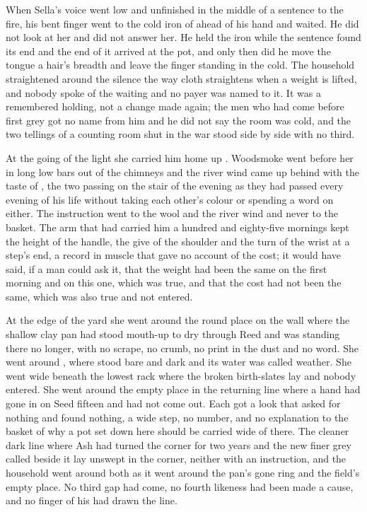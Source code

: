 When Sella's voice went low and unfinished in the middle of a sentence to the fire, his bent finger went to the cold iron of  ahead of his hand and waited. He did not look at her and did not answer her. He held the iron while the sentence found its end and the end of it arrived at the pot, and only then did he move the tongue a hair's breadth and leave the finger standing in the cold. The household straightened around the silence the way cloth straightens when a weight is lifted, and nobody spoke of the waiting and no payer was named to it. It was a remembered holding, not a change made again; the men who had come before first grey got no name from him and he did not say the room was cold, and the two tellings of a counting room shut in the war stood side by side with no third.

At the going of the light she carried him home up . Woodsmoke went before her in long low bars out of the chimneys and the river wind came up behind with the taste of , the two passing on the stair of the evening as they had passed every evening of his life without taking each other's colour or spending a word on either. The instruction went to the wool and the river wind and never to the basket. The arm that had carried him a hundred and eighty-five mornings kept the height of the handle, the give of the shoulder and the turn of the wrist at a step's end, a record in muscle that gave no account of the cost; it would have said, if a man could ask it, that the weight had been the same on the first morning and on this one, which was true, and that the cost had not been the same, which was also true and not entered.

At the edge of the yard she went around the round place on the wall where the shallow clay pan had stood mouth-up to dry through Reed and was standing there no longer, with no scrape, no crumb, no print in the dust and no word. She went around , where  stood bare and dark and its water was called weather. She went wide beneath the lowest rack where the broken birth-slates lay and nobody entered. She went around the empty place in the returning line where a hand had gone in on Seed fifteen and had not come out. Each got a look that asked for nothing and found nothing, a wide step, no number, and no explanation to the basket of why a pot set down here should be carried wide of there. The cleaner dark line where Ash had turned the corner for two years and the new finer grey called  beside it lay unswept in the corner, neither with an instruction, and the household went around both as it went around the pan's gone ring and the field's empty place. No third gap had come, no fourth likeness had been made a cause, and no finger of his had drawn the line.

